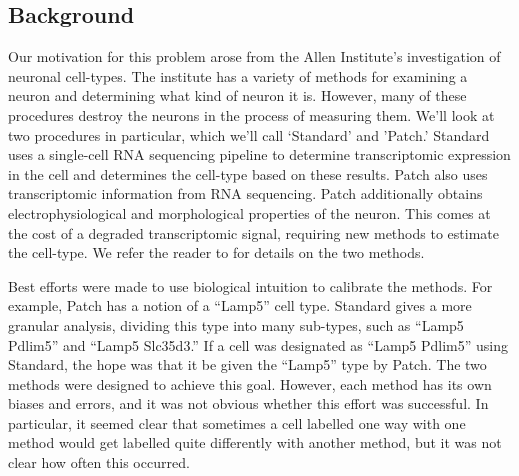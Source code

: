 
\subsection{Background}

Our motivation for this problem arose from the Allen Institute's investigation of neuronal cell-types.  The institute has a variety of methods for examining a neuron and determining what kind of neuron it is.  However, many of these procedures destroy the neurons in the process of measuring them.  We'll look at two procedures in particular, which we'll call `Standard' and 'Patch.'  Standard uses a single-cell RNA sequencing pipeline to determine transcriptomic expression in the cell and determines the cell-type based on these results.  Patch also uses transcriptomic information from RNA sequencing.  Patch additionally obtains electrophysiological and morphological properties of the neuron.  This comes at the cost of a degraded transcriptomic signal, requiring new methods to estimate the cell-type.  We refer the reader to \citep{tasic2017shared} for details on the two methods.

Best efforts were made to use biological intuition to calibrate the methods.  For example, Patch has a notion of a ``Lamp5'' cell type.  Standard gives a more granular analysis, dividing this type into many sub-types, such as ``Lamp5 Pdlim5'' and ``Lamp5 Slc35d3.''  If a cell was designated as ``Lamp5 Pdlim5'' using Standard, the hope was that it be given the ``Lamp5'' type by Patch.  The two methods were designed to achieve this goal.  However, each method has its own biases and errors, and it was not obvious whether this effort was successful.  In particular, it seemed clear that sometimes a cell labelled one way with one method would get labelled quite differently with another method, but it was not clear how often this occurred.  

